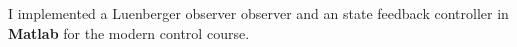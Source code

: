 \item{I implemented a Luenberger observer observer and an state feedback controller in \textbf{Matlab} for the modern control course.}

